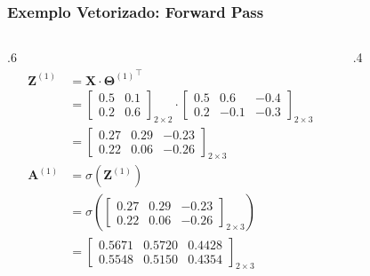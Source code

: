 \documentclass[aspectratio=169, xcolor=dvipsnames]{beamer}
\begin{document}
  \begin{frame}
    \frametitle{Exemplo Vetorizado: Forward Pass}
    \begin{columns}
        \begin{column}{.6\linewidth}
        \small
        \begin{align*}
            \mathbf{Z}^{(1)} &= \mathbf{X} \cdot{\mathbf{\Theta}^{(1)}}^{\top}\\
            &= \begin{bmatrix}
        0.5 & 0.1 \\
        0.2 & 0.6
      \end{bmatrix}_{2\times2}\cdot
      \begin{bmatrix}
        0.5 & 0.6  & -0.4 \\
        0.2 & -0.1 & -0.3
      \end{bmatrix}_{2\times3}\\
      &=\begin{bmatrix}
        0.27 & 0.29 & -0.23 \\
        0.22 & 0.06 & -0.26
      \end{bmatrix}_{2\times3}\\
      \mathbf{A}^{(1)} &= \sigma(\mathbf{Z}^{(1)})\\
      &= \sigma\left(\begin{bmatrix}
        0.27 & 0.29 & -0.23 \\
        0.22 & 0.06 & -0.26
      \end{bmatrix}_{2\times3}\right)
      \\
      &=\begin{bmatrix}
        0.5671 & 0.5720 & 0.4428 \\
        0.5548 & 0.5150 & 0.4354
      \end{bmatrix}_{2\times3}
    \end{align*}                
    
        \end{column}
        \begin{column}{.4\textwidth}
            \begin{figure}
                \centering
                \resizebox{\linewidth}{!}{
                }
            \end{figure}
        \end{column}    
    \end{columns}
  \end{frame}
\end{document}
